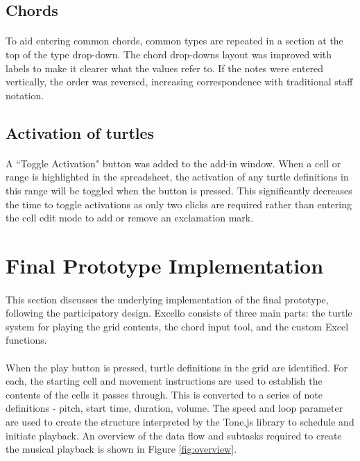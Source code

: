 \subsection{Chords}

\paragraph{} To aid entering common chords, common types are repeated in a section at the top of the type drop-down. The chord drop-downs layout was improved with labels to make it clearer what the values refer to. If the notes were entered vertically, the order was reversed, increasing correspondence with traditional staff notation.

\subsection{Activation of turtles}

\paragraph{} A ``Toggle Activation" button was added to the add-in window. When a cell or range is highlighted in the spreadsheet, the activation of any turtle definitions in this range will be toggled when the button is pressed.  This significantly decreases the time to toggle activations as only two clicks are required rather than entering the cell edit mode to add or remove an exclamation mark.

\section{Final Prototype Implementation}

\paragraph{} This section discusses the underlying implementation of the final prototype, following the participatory design. Excello consists of three main parts: the turtle system for playing the grid contents, the chord input tool, and the custom Excel functions.

\paragraph{} When the play button is pressed, turtle definitions in the grid are identified. For each, the starting cell and movement instructions are used to establish the contents of the cells it passes through. This is converted to a series of note definitions - pitch, start time, duration, volume. The speed and loop parameter are used to create the structure interpreted by the Tone.js library to schedule and initiate playback. An overview of the data flow and subtasks required to create the musical playback is shown in Figure \ref{fig:overview}.

